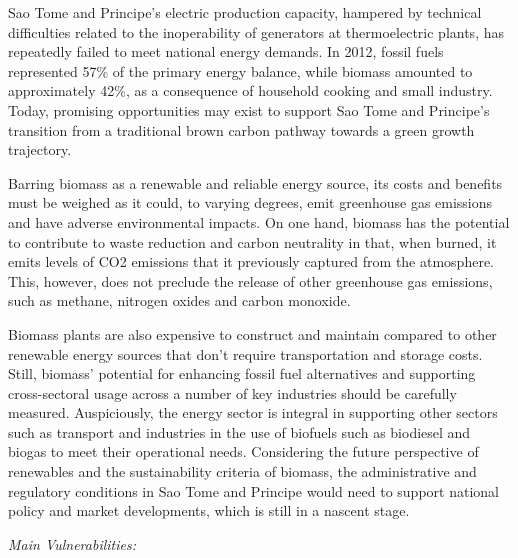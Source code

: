 \documentclass[
]{book}
\begin{document}
Sao Tome and Principe's electric production capacity, hampered by technical difficulties related to the inoperability of generators at thermoelectric plants, has repeatedly failed to meet national energy demands. In 2012, fossil fuels represented 57\% of the primary energy balance, while biomass amounted to approximately 42\%, as a consequence of household cooking and small industry. Today, promising opportunities may exist to support Sao Tome and Principe's transition from a traditional brown carbon pathway towards a green growth trajectory.

Barring biomass as a renewable and reliable energy source, its costs and benefits must be weighed as it could, to varying degrees, emit greenhouse gas emissions and have adverse environmental impacts. On one hand, biomass has the potential to contribute to waste reduction and carbon neutrality in that, when burned, it emits levels of CO2 emissions that it previously captured from the atmosphere. This, however, does not preclude the release of other greenhouse gas emissions, such as methane, nitrogen oxides and carbon monoxide.

Biomass plants are also expensive to construct and maintain compared to other renewable energy sources that don't require transportation and storage costs. Still, biomass' potential for enhancing fossil fuel alternatives and supporting cross-sectoral usage across a number of key industries should be carefully measured. Auspiciously, the energy sector is integral in supporting other sectors such as transport and industries in the use of biofuels such as biodiesel and biogas to meet their operational needs. Considering the future perspective of renewables and the sustainability criteria of biomass, the administrative and regulatory conditions in Sao Tome and Principe would need to support national policy and market developments, which is still in a nascent stage.

\emph{Main Vulnerabilities:}
\end{document}
